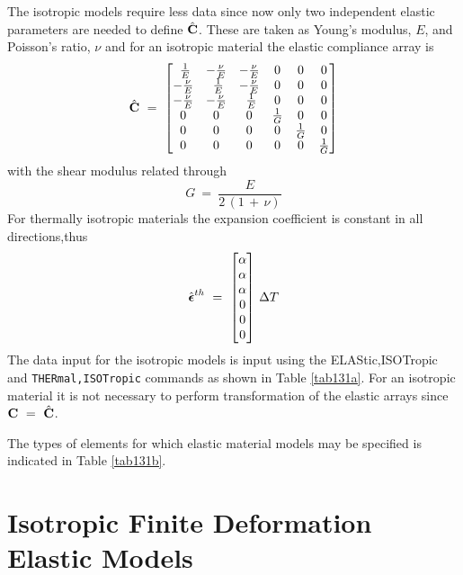 The isotropic models require less data since now only two independent
elastic parameters are needed to define $\hat{\mathbf{C}}$. These are
taken as Young's modulus, $E$, and Poisson's ratio, $\nu$ and
for an isotropic material the elastic compliance array is
\begin{equation}
\hat{\mathbf{C}} ~=~ \left[
\begin{matrix}
~\frac{1}{E} & - \frac{\nu}{E} & - \frac{\nu}{E} & 0 & 0 & 0 \\
- \frac{\nu}{E} & ~\frac{1}{E} & - \frac{\nu}{E} & 0 & 0 & 0 \\
- \frac{\nu}{E} & - \frac{\nu}{E} & ~\frac{1}{E} & 0 & 0 & 0 \\
0 & 0 & 0 & \frac{1}{G} & 0 & 0 \\
0 & 0 & 0 & 0 & \frac{1}{G} & 0 \\
0 & 0 &0 & 0 & 0 & \frac{1}{G} \\
\end{matrix} \right]
\end{equation}
with the shear modulus related through
\begin{equation}
G ~=~ \frac{E}{2 \, (1 \,+ \, \nu)}
\end{equation}
For thermally isotropic materials the expansion coefficient is constant in
all directions,thus
\begin{equation}
\hat{\boldsymbol{\epsilon}}^{th} ~=~ \left[ \begin{matrix}
\alpha \\ \alpha \\ \alpha \\ 0 \\ 0 \\ 0 \\
\end{matrix} \right]
\, \Delta T
\end{equation}
The data input for the isotropic models is input using
the {ELASt\-ic,ISOTrop\-ic}
and {\tt THERm\-al,ISOTrop\-ic} commands as shown in Table \ref{tab131a}.
For an isotropic material it is not necessary to perform transformation of
the elastic arrays since $\mathbf{C} ~=~ \hat{\mathbf{C}}$.

The types of elements for which elastic material models may be specified
is indicated in Table \ref{tab131b}.

\section{Isotropic Finite Deformation Elastic Models}
\label{isofel}

